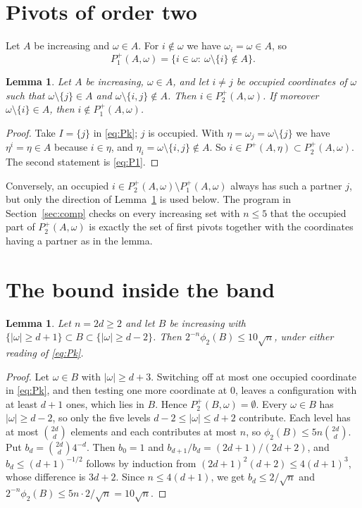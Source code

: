 \documentclass[11pt]{amsart}
\newtheorem{lemma}[theorem]{Lemma}
\theoremstyle{definition}
\theoremstyle{remark}
\numberwithin{equation}{section}
\begin{document}
\section{Pivots of order two}

Let $A$ be increasing and $\omega\in A$. For $i\notin\omega$ we have $\omega_i=\omega\in A$, so
\begin{equation}\label{eq:P1}
P_1^+(A,\omega)=\{i\in\omega:\ \omega\setminus\{i\}\notin A\}.
\end{equation}

\begin{lemma}\label{lem:pair}
Let $A$ be increasing, $\omega\in A$, and let $i\ne j$ be occupied coordinates of $\omega$ such that $\omega\setminus\{j\}\in A$ and $\omega\setminus\{i,j\}\notin A$. Then $i\in P_2^+(A,\omega)$. If moreover $\omega\setminus\{i\}\in A$, then $i\notin P_1^+(A,\omega)$.
\end{lemma}

\begin{proof}
Take $I=\{j\}$ in \eqref{eq:Pk}; $j$ is occupied. With $\eta=\omega_j=\omega\setminus\{j\}$ we have $\eta^i=\eta\in A$ because $i\in\eta$, and $\eta_i=\omega\setminus\{i,j\}\notin A$. So $i\in P^+(A,\eta)\subset P_2^+(A,\omega)$. The second statement is \eqref{eq:P1}.
\end{proof}

Conversely, an occupied $i\in P_2^+(A,\omega)\setminus P_1^+(A,\omega)$ always has such a partner $j$, but only the direction of Lemma~\ref{lem:pair} is used below. The program in Section~\ref{sec:comp} checks on every increasing set with $n\le5$ that the occupied part of $P_2^+(A,\omega)$ is exactly the set of first pivots together with the coordinates having a partner as in the lemma.

\section{The bound inside the band}

\begin{lemma}\label{lem:band}
Let $n=2d\ge2$ and let $B$ be increasing with $\{|\omega|\ge d+1\}\subset B\subset\{|\omega|\ge d-2\}$. Then $2^{-n}\phi_2(B)\le10\sqrt n$, under either reading of \eqref{eq:Pk}.
\end{lemma}

\begin{proof}
Let $\omega\in B$ with $|\omega|\ge d+3$. Switching off at most one occupied coordinate in \eqref{eq:Pk}, and then testing one more coordinate at $0$, leaves a configuration with at least $d+1$ ones, which lies in $B$. Hence $P_2^+(B,\omega)=\emptyset$. Every $\omega\in B$ has $|\omega|\ge d-2$, so only the five levels $d-2\le|\omega|\le d+2$ contribute. Each level has at most $\binom{2d}{d}$ elements and each contributes at most $n$, so $\phi_2(B)\le5n\binom{2d}{d}$. Put $b_d=\binom{2d}{d}4^{-d}$. Then $b_0=1$ and $b_{d+1}/b_d=(2d+1)/(2d+2)$, and $b_d\le(d+1)^{-1/2}$ follows by induction from $(2d+1)^2(d+2)\le4(d+1)^3$, whose difference is $3d+2$. Since $n\le4(d+1)$, we get $b_d\le2/\sqrt n$ and $2^{-n}\phi_2(B)\le5n\cdot2/\sqrt n=10\sqrt n$.
\end{proof}
\end{document}
